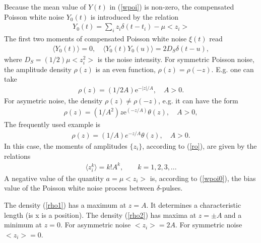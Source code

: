 \documentclass[authoryear,draft,1p,times]{elsarticle}
\renewcommand{\=}{\stackrel{\mathrm{d}}{=}}
\begin{document}
Because the mean value of $Y(t)$ in (\ref{wpoi}) is non-zero, the compensated Poisson  white  noise $Y_0(t)$ is introduced by the relation 
%
\begin{eqnarray} \label{wpoi0}
Y_0(t) = \sum\limits_{i} z_i \delta (t-t_i) -\mu <z_i>
\end{eqnarray}
%
The first two moments of compensated Poisson white noise $\xi(t)$ read
%
\begin{eqnarray}    \label{S}
\langle Y_0(t) \rangle  = 0, \quad
\langle Y_0(t) Y_0(u) \rangle = 2D_S \delta (t-u),
\end{eqnarray}
%
where $D_S=(1/2)\mu <z_i^2>$ is the  noise intensity.
%
%
For symmetric  Poisson noise, the amplitude density $\rho(z)$ 
is an even function, $\rho(z)=\rho(-z)$. E.g. one can take 
%
\begin{eqnarray} \label{rho2}
\rho(z) = (1/2 A)  \mbox{e}^{- \vert z \vert /A}, 
 \quad A > 0.
\end{eqnarray}
%
For asymetric noise, the density $\rho(z)\ne \rho(-z)$, e.g. it can have the form 
%
\begin{eqnarray} \label{rho1}
\rho(z) = (1/ A^2) z \mbox{e}^{(- z /A)} \theta(z) , \quad A > 0,
\end{eqnarray}
%
The frequently used example is 
%
\begin{eqnarray} \label{ro}
\rho(z) = (1/A)  e^{-z/A}  \theta (z), \quad A>0. 
\end{eqnarray}
In this case, the moments of amplitudes
$\{z_i\}$,
according to (\ref{ro}), are given by the relations
%
\begin{eqnarray} \label{mom}
\langle z_i^k \rangle = k!A^k, \qquad k=1,2,3,...
\end{eqnarray}
%
A negative value of the quantity  $a = \mu <z_i>$
is, according to (\ref{wpoi0}), the bias value of the  Poisson white  noise process between
$\delta$-pulses.

The density (\ref{rho1}) has a maximum at $z = A$. It determines a characteristic
length (is x is a position).
The density (\ref{rho2}) has  maxima at $z =\pm A$ and a
minimum at $z = 0$.
For asymmetric noise $<z_i> = 2 A$. For symmetric
noise $<z_i> = 0$. \\
\end{document}
